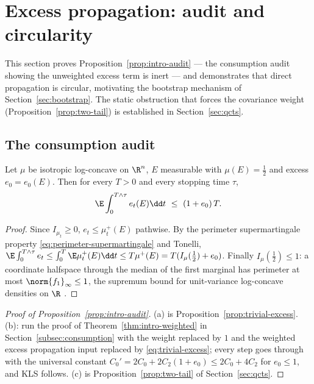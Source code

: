 \documentclass[../../main.tex]{subfiles}
\begin{document}
\section{Excess propagation: audit and circularity}
\label{sec:excess}

This section proves Proposition~\ref{prop:intro-audit} --- the consumption audit showing the
unweighted excess term is inert --- and demonstrates that direct propagation is circular,
motivating the bootstrap mechanism of Section~\ref{sec:bootstrap}. The static obstruction that
forces the covariance weight (Proposition~\ref{prop:two-tail}) is established in
Section~\ref{sec:qcts}.

\subsection{The consumption audit}

\begin{proposition}
\label{prop:trivial-excess}
Let $\mu$ be isotropic log-concave on $\R^n$, $E$ measurable with $\mu(E)=\tfrac12$ and excess
$e_0=e_0(E)$. Then for every $T>0$ and every stopping time $\tau$,
\begin{equation}\label{eq:trivial-excess}
  \E\int_0^{T\wedge\tau}e_t(E)\dd t\ \le\ (1+e_0)\,T .
\end{equation}
\end{proposition}

\begin{proof}
Since $I_{\mu_t}\ge0$, $e_t\le\mu_t^+(E)$ pathwise. By the perimeter supermartingale property
\eqref{eq:perimeter-supermartingale} and Tonelli,
$\E\int_0^{T\wedge\tau}e_t\le\int_0^T\E\mu_t^+(E)\dd t\le T\mu^+(E)=T(I_\mu(\tfrac12)+e_0)$.
Finally $I_\mu(\tfrac12)\le1$: a coordinate halfspace through the median of the first marginal
has perimeter at most $\norm{f_1}_\infty\le1$, the supremum bound for unit-variance log-concave
densities on $\R$ \cite{Bobkov1999LogConcave}.
\end{proof}

\begin{proof}[Proof of Proposition~\ref{prop:intro-audit}]
(a) is Proposition~\ref{prop:trivial-excess}. (b): run the proof of
Theorem~\ref{thm:intro-weighted} in Section~\ref{subsec:consumption} with the weight replaced
by $1$ and the weighted excess propagation input replaced by \eqref{eq:trivial-excess}; every
step goes through with the universal constant $C_0'=2C_0+2C_2(1+e_0)\le2C_0+4C_2$ for
$e_0\le1$, and KLS follows. (c) is Proposition~\ref{prop:two-tail} of Section~\ref{sec:qcts}.
\end{proof}
\end{document}
